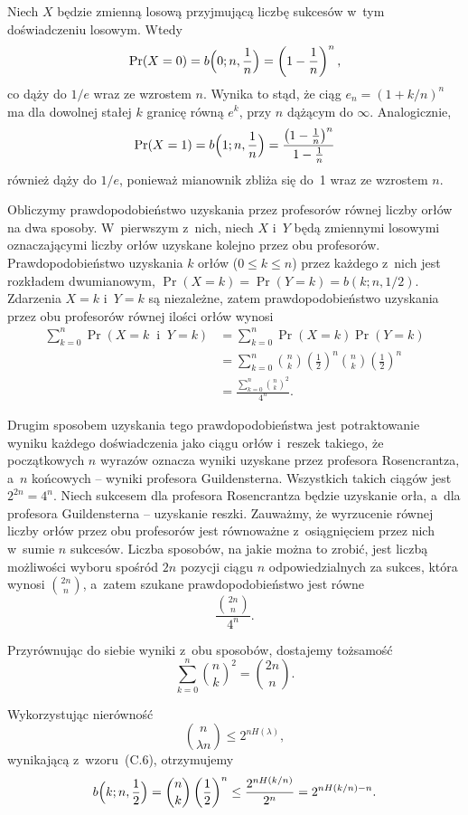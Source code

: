 \exercise{} %
Niech $X$ będzie zmienną losową przyjmującą liczbę sukcesów w~tym doświadczeniu losowym. Wtedy
\[
	\Pr(X=0) = b\Bigl(0;n,\frac{1}{n}\Bigr) = \left(1-\frac{1}{n}\right)^n,
\]
co dąży do $1/e$ wraz ze wzrostem $n$. Wynika to stąd, że ciąg $e_n={(1+k/n)}^n$ ma dla dowolnej stałej $k$ granicę równą $e^k$, przy $n$ dążącym do $\infty$.
Analogicznie,
\[
	\Pr(X=1) = b\Bigl(1;n,\frac{1}{n}\Bigr) = \frac{\left(1-\frac{1}{n}\right)^n}{1-\frac{1}{n}}
\]
również dąży do $1/e$, ponieważ mianownik zbliża się do~1 wraz ze wzrostem $n$.

\exercise{} %
Obliczymy prawdopodobieństwo uzyskania przez profesorów równej liczby orłów na dwa sposoby. W~pierwszym z~nich, niech $X$ i~$Y$ będą zmiennymi losowymi oznaczającymi liczby orłów uzyskane kolejno przez obu profesorów. Prawdopodobieństwo uzyskania $k$ orłów ($0\le k\le n$) przez każdego z~nich jest rozkładem dwumianowym, $\Pr(X=k)=\Pr(Y=k)=b(k;n,1/2)$. Zdarzenia $X=k$ i~$Y=k$ są niezależne, zatem prawdopodobieństwo uzyskania przez obu profesorów równej ilości orłów wynosi
\begin{align*}
	\sum_{k=0}^n\Pr(X=k\;\;\text{i}\;\;Y=k) &= \sum_{k=0}^n\Pr(X=k)\Pr(Y=k) \\
	&= \sum_{k=0}^n\binom{n}{k}\left(\frac{1}{2}\right)^n\binom{n}{k}\left(\frac{1}{2}\right)^n \\
	&= \frac{\sum_{k=0}^n\binom{n}{k}^2}{4^n}.
\end{align*}

Drugim sposobem uzyskania tego prawdopodobieństwa jest potraktowanie wyniku każdego doświadczenia jako  ciągu orłów i~reszek takiego, że początkowych $n$ wyrazów oznacza wyniki uzyskane przez profesora Rosencrantza, a~$n$ końcowych -- wyniki profesora Guildensterna. Wszystkich takich ciągów jest $2^{2n}=4^n$. Niech sukcesem dla profesora Rosencrantza będzie uzyskanie orła, a~dla profesora Guildensterna -- uzyskanie reszki. Zauważmy, że wyrzucenie równej liczby orłów przez obu profesorów jest równoważne z~osiągnięciem przez nich w~sumie $n$ sukcesów. Liczba sposobów, na jakie można to zrobić, jest liczbą możliwości wyboru spośród $2n$ pozycji ciągu $n$ odpowiedzialnych za sukces, która wynosi $\binom{2n}{n}$, a~zatem szukane prawdopodobieństwo jest równe
\[
	\frac{\binom{2n}{n}}{4^n}.
\]

Przyrównując do siebie wyniki z~obu sposobów, dostajemy tożsamość
\[
	\sum_{k=0}^n\binom{n}{k}^2 = \binom{2n}{n}.
\]

\exercise{} %
Wykorzystując nierówność
\[
	\binom{n}{\lambda n} \le 2^{nH(\lambda)},
\]
wynikającą z~wzoru~(C.6), otrzymujemy
\[
	b\Bigl(k;n,\frac{1}{2}\Bigr) = \binom{n}{k}\left(\frac{1}{2}\right)^n \le \frac{2^{nH(k/n)}}{2^n} = 2^{nH(k/n)-n}.
\]

